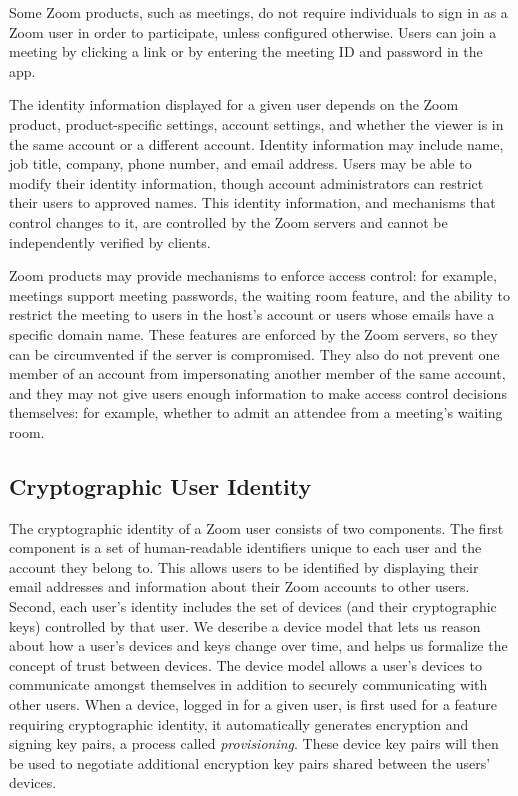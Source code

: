 Some Zoom products, such as meetings, do not require individuals to sign in as a Zoom user in order
to participate, unless configured otherwise. Users can join a meeting by clicking a link or by
entering the meeting ID and password in the app.

The identity information displayed for a given user depends on the Zoom product, product-specific
settings, account settings, and whether the viewer is in the same account or a different account.
Identity information may include name, job title, company, phone number, and email address. Users
may be able to modify their identity information, though account administrators can restrict their
users to approved names. This identity information, and mechanisms that control changes to it, are
controlled by the Zoom servers and cannot be independently verified by clients.



Zoom products may provide mechanisms to enforce access control: for example, meetings support
meeting passwords, the waiting room feature, and the ability to restrict the meeting to users in the
host's account or users whose emails have a specific domain name. These features are enforced by the
Zoom servers, so they can be circumvented if the server is compromised. They also do not prevent one
member of an account from impersonating another member of the same account, and they may not give
users enough information to make access control decisions themselves: for example, whether to admit
an attendee from a meeting's waiting room.

\subsection{Cryptographic User Identity}

The cryptographic identity of a Zoom user consists of two components. The first component is a set
of human-readable identifiers unique to each user and the account they belong to. This allows users
to be identified by displaying their email addresses and information about their Zoom accounts to
other users. Second, each user's identity includes the set of devices (and their cryptographic keys)
controlled by that user. We describe a device model that lets us reason about how a user's devices
and keys change over time, and helps us formalize the concept of trust between devices. The device
model allows a user's devices to communicate amongst themselves in addition to
securely communicating with other users. When a device, logged in for a given
user, is first used for a feature requiring cryptographic identity, it
automatically generates encryption and signing key pairs, a process called
\textit{provisioning}. These device key pairs will then be used to
negotiate additional encryption key pairs shared between the users' devices.

